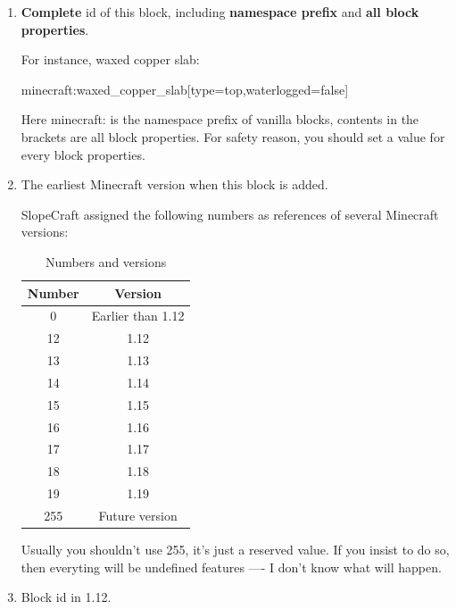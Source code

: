 \documentclass{article}
\begin{document}
\begin{enumerate}
    \item \textbf{Complete} id of this block, including \textbf{namespace prefix} and \textbf{all block properties}.

          For instance, waxed copper slab:

          minecraft:waxed\_copper\_slab[type=top,waterlogged=false]

          Here minecraft: is the namespace prefix of vanilla blocks, contents in the brackets are all block properties. For safety reason, you should set a value for every block properties.

    \item The earliest Minecraft version when this block is added.

          SlopeCraft assigned the following numbers as references of several Minecraft versions:
          \begin{table}[h]
              \centering
              \caption{Numbers and versions}
              \label{VerAndRealVer}
              \begin{tabular}{cc}\hline
                  Number & Version           \\ \hline
                  0      & Earlier than 1.12 \\
                  12     & 1.12              \\
                  13     & 1.13              \\
                  14     & 1.14              \\
                  15     & 1.15              \\
                  16     & 1.16              \\
                  17     & 1.17              \\
                  18     & 1.18              \\
                  19     & 1.19              \\
                  255    & Future version    \\
                  \hline
              \end{tabular}
          \end{table}

          Usually you shouldn't use 255, it's just a reserved value. If you insist to do so, then everyting will be undefined features ---- I don't know what will happen.

    \item Block id in 1.12.


\end{enumerate}
\end{document}
